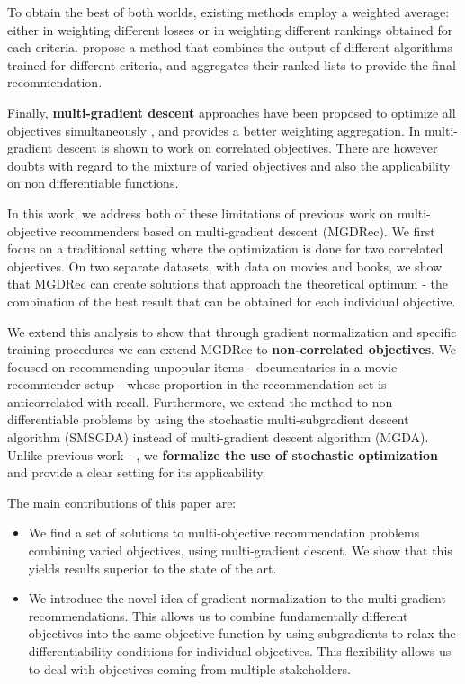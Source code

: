 \documentclass[letterpaper]{article}
\begin{document}
To obtain the best of both worlds, existing methods employ a weighted average: either in weighting different losses or in weighting different rankings obtained for each criteria. \cite{ribeiro2015multiobjective} propose a method that combines the output of different algorithms trained for different criteria, and aggregates their ranked lists to provide the final recommendation. 

Finally, \textbf{multi-gradient descent} approaches have been proposed to optimize all objectives simultaneously \cite{Lin:2019:PAM:3298689.3346998}, and provides a better weighting aggregation. In  \cite{Lin:2019:PAM:3298689.3346998} multi-gradient descent is shown to work on correlated objectives. There are however doubts with regard to the mixture of varied objectives and also the applicability on non differentiable functions.

In this work, we address both of these limitations of previous work on multi-objective recommenders based on multi-gradient descent (MGDRec). We first focus on a traditional setting where the optimization is done for two correlated objectives. On two separate datasets, with data on movies and books, we show that MGDRec can create solutions that approach the theoretical optimum - the combination of the best result that can be obtained for each individual objective.

We extend this analysis to show that through gradient normalization and specific training procedures we can extend MGDRec to \textbf{non-correlated objectives}. We focused on recommending unpopular items - documentaries in a movie recommender setup - whose proportion in the recommendation set is anticorrelated with recall. 
Furthermore, we extend the method to non differentiable problems by using the stochastic multi-subgradient descent algorithm (SMSGDA) instead of multi-gradient descent algorithm (MGDA).
Unlike previous work - \cite{Lin:2019:PAM:3298689.3346998}, we \textbf{formalize the use of stochastic optimization} and provide a clear setting for its applicability. 

The main contributions of this paper are:
\begin{itemize}
    \item We find a set of solutions to multi-objective recommendation problems combining varied objectives, using multi-gradient descent. We show that this yields results superior to the state of the art.
    \item We introduce the novel idea of gradient normalization to the multi gradient recommendations. This allows us to combine fundamentally different objectives into the same objective function by using subgradients to relax the differentiability conditions for individual objectives. This flexibility allows us to deal with objectives coming from multiple stakeholders.
\end{itemize}
\end{document}

